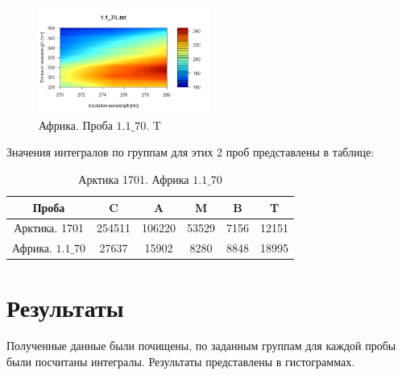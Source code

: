 \newpage
 \begin{figure}[!htb]
    \centering
    \includegraphics[width=0.5\textwidth]{fig/Africa_3_T.png}
    \caption{Африка. Проба $1.1\_70$. T}
\end{figure}
Значения интегралов по группам для этих 2 проб представлены в таблице:
\begin{table}[!ht]
	\centering
		\begin{tabular} {|c|c|c|c|c|c|}
			\hline
			Проба & C & A & M & B & T \\ \hline
			Арктика. 1701 & 254511 & 106220 & 53529 & 7156 & 12151 \\ \hline 
			Африка. $1.1\_70$ & 27637 & 15902 & 8280 & 8848 & 18995 \\ \hline 
		\end{tabular}
		\caption{Арктика 1701. Африка $1.1\_70$}
\end{table}

\section{Результаты}
Полученные данные были почищены, по заданным группам для каждой пробы были посчитаны интегралы. Результаты представлены в гистограммах.


